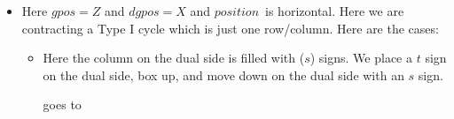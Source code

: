 \documentclass[12pt]{article}
\numberwithin{equation}{section}
\newcommand{\horizontalDominoRSShift}[4]{\filldraw [dominoRSStyle] (#2 - 1 + #4 + \eps, #1 - 1 + \eps) rectangle + (2 - \teps, 1 -\teps) node [dominoText] {$#3$};}
\newcommand{\verticalDominoRSShift}[4]{\filldraw [dominoRSStyle] (#2 - 1 + #4 + \eps,  #1 - 1 + \eps) rectangle + (1 - \teps,2 -\teps) node [dominoText] {$#3$};}
\newcommand{\pos}{$position$}
\begin{document}
\begin{itemize}
    \item Here $gpos = Z$ and $dgpos = X$ and \pos\ is horizontal.
    Here we are contracting a Type I cycle which is just one row/column.
    Here are the cases:
    \begin{itemize}
      \item Here the column on the dual side is filled with ($s$) signs.
      We place a $t$ sign on the dual side, box up, and move down on the dual side with an $s$ sign.
      \begin{figure}[H]
        \centering
      \end{figure}
      goes to
      \begin{figure}[H]
        \centering
      \end{figure}


\end{itemize}
\end{itemize}
\end{document}
